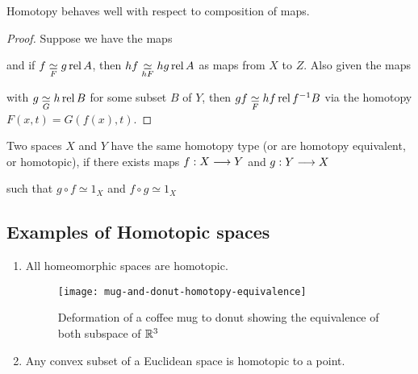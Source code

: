 \begin{lem}\label{lem:hom-top-comp}
    Homotopy behaves well with respect to composition of maps.
\end{lem}

\begin{proof}
    Suppose we have the maps
    \begin{center}
    \end{center}
    and if $f \underset{F}{\simeq} g \operatorname{rel} A$, then $hf \underset{hF}{\simeq} hg \operatorname{rel} A$ as maps from $X$ to $Z$. Also given the maps
    \begin{center}
    \end{center}
    with $g \underset{G}{\simeq} h \operatorname{rel} B$ for some subset $B$ of $Y$, then $gf \underset{F}{\simeq} hf \operatorname{rel} f^{-1} B$ via the homotopy $F(x,t) = G(f(x), t)$.
\end{proof}

\begin{defn}
Two spaces $X$ and $Y$ have the same homotopy type (or are homotopy equivalent, or homotopic), if there exists maps $f: X \longrightarrow Y$ and $g : Y \longrightarrow X$
\begin{center}
\end{center} 
such that $g \circ f \simeq 1_X$ and $f \circ g \simeq 1_X$
\end{defn}


\subsection*{Examples of Homotopic spaces}
\begin{enumerate}
\item All homeomorphic spaces are homotopic.
\begin{figure}[H]
    \centering
    \texttt{[image: mug-and-donut-homotopy-equivalence]}
    \caption{Deformation of a coffee mug to donut showing the equivalence of both subspace of $\mathbb{R}^3$}
\end{figure}
\item Any convex subset of a Euclidean space is homotopic to a point.
\end{enumerate}

